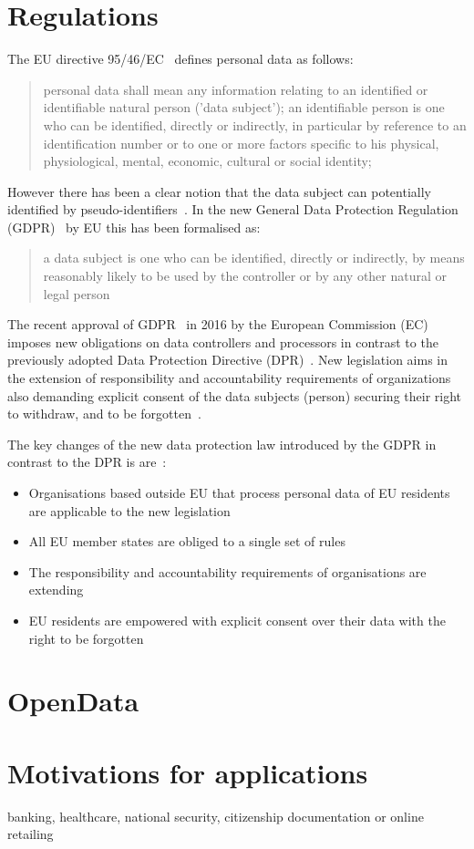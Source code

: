 \section{Regulations}\label{problem:regulations}

The EU directive 95/46/EC~\cite{eu-46ec-1995} defines personal data as follows:
\blockquote{
personal data shall mean any information relating to an identified or identifiable natural person ('data subject'); an identifiable person is one who can be identified, directly or indirectly, in particular by reference to an identification number or to one or more factors specific to his physical, physiological, mental, economic, cultural or social identity;
}
However there has been a clear notion that the data subject can potentially identified by pseudo-identifiers~\cite{wiki:pii}.
In the new General Data Protection Regulation (GDPR)~\cite{gdpr} by EU this has been formalised as:
\blockquote{
a data subject is one who can be identified, directly or indirectly, by means reasonably likely to be used by the controller or by any other natural or legal person
}

The recent approval of GDPR~\cite{gdpr} in 2016 by the European Commission (EC)
imposes new obligations on data controllers and processors in contrast to the previously adopted Data Protection Directive (DPR)~\cite{eu-46ec-1995}.
New legislation aims in the extension of responsibility and accountability requirements of organizations also demanding explicit
consent of the data subjects (person) securing their right to withdraw, and to be forgotten~\cite{DBLP:journals/corr/NeisseSF17}.

The key changes of the new data protection law introduced by the GDPR in contrast to the DPR is are~\cite{DBLP:journals/corr/NeisseSF17}:
\begin{itemize}
    \item Organisations based outside EU that process personal data of EU residents are applicable to the new legislation
    \item All EU member states are obliged to a single set of rules
    \item The responsibility and accountability requirements of organisations are extending
    \item EU residents are empowered with explicit consent over their data with the right to be forgotten
\end{itemize}

\section{OpenData}\label{problem:opendata}

\section{Motivations for applications}\label{problem:motivations}

banking, healthcare, national security, citizenship documentation or online retailing
